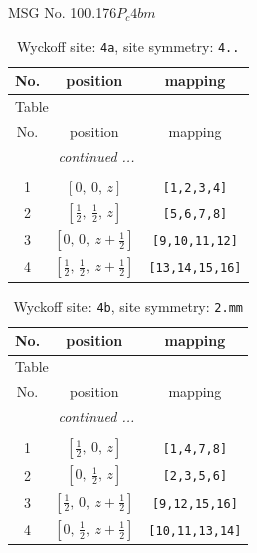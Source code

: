 \documentclass[fleqn,8pt]{jsarticle}
\begin{document}
\setcounter{MaxMatrixCols}{32}

\renewcommand{\tablename}{Table~}
\renewcommand{\figurename}{Figure~}
\begin{center}
\LARGE
MSG No. 100.176\quad$P_{c}4bm$
\end{center}
\renewcommand{\arraystretch}{1.2}
\begin{longtable}{ccc}
\caption{Wyckoff site: {\tt 4a}, site symmetry: {\tt 4..}}
 \\
 \hline \hline
No. & position & mapping \\ \hline \endfirsthead

\multicolumn{2}{l}{\tablename\ \thetable{}} \\
 \hline \hline
No. & position & mapping \\ \hline \endhead

 \hline \hline
\multicolumn{2}{r}{\footnotesize\it continued ...} \\ \endfoot

 \hline \hline
\multicolumn{2}{r}{} \\ \endlastfoot

1 & $\left[ 0,\, 0,\, z \right]$ & {\tt [1,2,3,4]} \\ \hline
2 & $\left[ \frac{1}{2},\, \frac{1}{2},\, z \right]$ & {\tt [5,6,7,8]} \\ \hline
3 & $\left[ 0,\, 0,\, z + \frac{1}{2} \right]$ & {\tt [9,10,11,12]} \\ \hline
4 & $\left[ \frac{1}{2},\, \frac{1}{2},\, z + \frac{1}{2} \right]$ & {\tt [13,14,15,16]} \\
\end{longtable}
\renewcommand{\arraystretch}{1.2}
\begin{longtable}{ccc}
\caption{Wyckoff site: {\tt 4b}, site symmetry: {\tt 2.mm}}
 \\
 \hline \hline
No. & position & mapping \\ \hline \endfirsthead

\multicolumn{2}{l}{\tablename\ \thetable{}} \\
 \hline \hline
No. & position & mapping \\ \hline \endhead

 \hline \hline
\multicolumn{2}{r}{\footnotesize\it continued ...} \\ \endfoot

 \hline \hline
\multicolumn{2}{r}{} \\ \endlastfoot

1 & $\left[ \frac{1}{2},\, 0,\, z \right]$ & {\tt [1,4,7,8]} \\ \hline
2 & $\left[ 0,\, \frac{1}{2},\, z \right]$ & {\tt [2,3,5,6]} \\ \hline
3 & $\left[ \frac{1}{2},\, 0,\, z + \frac{1}{2} \right]$ & {\tt [9,12,15,16]} \\ \hline
4 & $\left[ 0,\, \frac{1}{2},\, z + \frac{1}{2} \right]$ & {\tt [10,11,13,14]} \\
\end{longtable}
\end{document}
